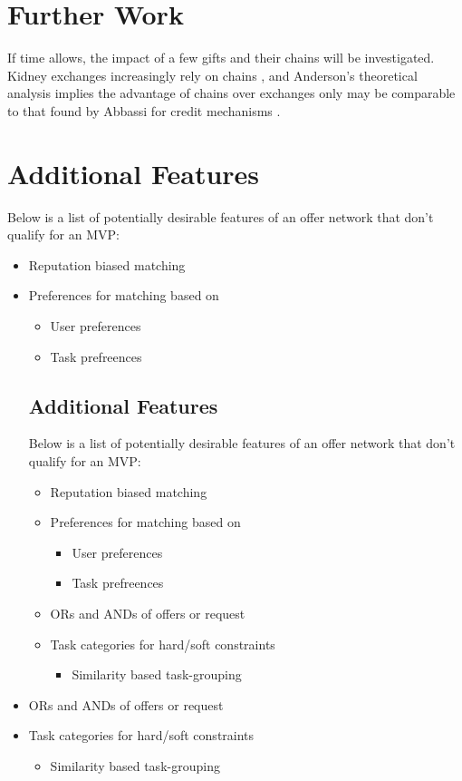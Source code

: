 \documentclass[main.tex]{subfiles}
\begin{document}
\section{Further Work}


If time allows, the impact of a few gifts and their chains will be investigated. Kidney exchanges increasingly rely on chains \cite{Dick}, and Anderson's theoretical analysis \cite{And1} implies the advantage of chains over exchanges only may be comparable to that found by Abbassi for credit mechanisms \cite{Abb2}.

\section{Additional Features}

Below is a list of potentially desirable features of an offer network that don't qualify for an MVP:
\begin{itemize}
  \item Reputation biased matching
  \item Preferences for matching based on
    \begin{itemize}
      \item User preferences
      \item Task prefreences
    \end{itemize}\subsection{Additional Features}

Below is a list of potentially desirable features of an offer network that don't qualify for an MVP:
\begin{itemize}
  \item Reputation biased matching
  \item Preferences for matching based on
    \begin{itemize}
      \item User preferences
      \item Task prefreences
    \end{itemize}
  \item ORs and ANDs of offers or request
  \item Task categories for hard/soft constraints
    \begin{itemize}
      \item Similarity based task-grouping
    \end{itemize}
\end{itemize}
  \item ORs and ANDs of offers or request
  \item Task categories for hard/soft constraints
    \begin{itemize}
      \item Similarity based task-grouping
    \end{itemize}
\end{itemize}
\end{document}
